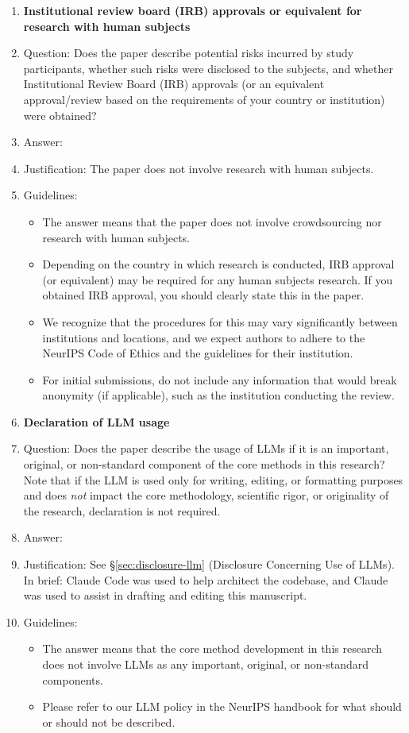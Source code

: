 \documentclass{article}
\begin{document}
\begin{enumerate}
\item {\bf Institutional review board (IRB) approvals or equivalent for research with human subjects}
    \item[] Question: Does the paper describe potential risks incurred by study participants, whether such risks were disclosed to the subjects, and whether Institutional Review Board (IRB) approvals (or an equivalent approval/review based on the requirements of your country or institution) were obtained?
    \item[] Answer: \answerNA{} %
    \item[] Justification: The paper does not involve research with human subjects.
    \item[] Guidelines:
    \begin{itemize}
        \item The answer \answerNA{} means that the paper does not involve crowdsourcing nor research with human subjects.
        \item Depending on the country in which research is conducted, IRB approval (or equivalent) may be required for any human subjects research. If you obtained IRB approval, you should clearly state this in the paper. 
        \item We recognize that the procedures for this may vary significantly between institutions and locations, and we expect authors to adhere to the NeurIPS Code of Ethics and the guidelines for their institution. 
        \item For initial submissions, do not include any information that would break anonymity (if applicable), such as the institution conducting the review.
    \end{itemize}

\item {\bf Declaration of LLM usage}
    \item[] Question: Does the paper describe the usage of LLMs if it is an important, original, or non-standard component of the core methods in this research? Note that if the LLM is used only for writing, editing, or formatting purposes and does \emph{not} impact the core methodology, scientific rigor, or originality of the research, declaration is not required.
    \item[] Answer: \answerYes{} %
    \item[] Justification: See \S\ref{sec:disclosure-llm} (Disclosure Concerning Use of LLMs). In brief: Claude Code was used to help architect the codebase, and Claude was used to assist in drafting and editing this manuscript.
    \item[] Guidelines:
    \begin{itemize}
        \item The answer \answerNA{} means that the core method development in this research does not involve LLMs as any important, original, or non-standard components.
        \item Please refer to our LLM policy in the NeurIPS handbook for what should or should not be described.
    \end{itemize}

\end{enumerate}
\end{document}
